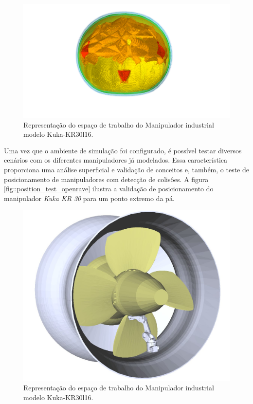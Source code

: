 \begin{figure}[h!]
\centering
	\includegraphics[width=\columnwidth]{figs/openrave/workspace_kr30l16_openrave}
	\caption{Representação do espaço de trabalho do Manipulador industrial
	modelo Kuka-KR30l16.}
	\label{fig::workspace_openrave}
\end{figure}

Uma vez que o ambiente de simulação foi configurado, é possível testar diversos
cenários com os diferentes manipuladores já modelados. Essa característica
proporciona uma análise superficial e validação de conceitos e, também, o teste
de posicionamento de manipuladores com detecção de colisôes. A figura
\ref{fig::position_test_openrave} ilustra a validação de posicionamento do
manipulador \textit{Kuka KR 30} para um ponto extremo da pá. 

\begin{figure}[h!]
\centering
	\includegraphics[width=\columnwidth]{figs/openrave/position_test_openrave}
	\caption{Representação do espaço de trabalho do Manipulador industrial
	modelo Kuka-KR30l16.}
	\label{fig::workspace_openrave}
\end{figure}

